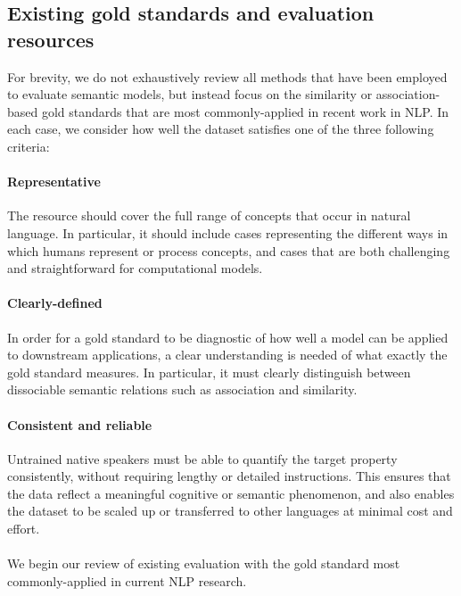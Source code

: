 \documentclass[fullname]{clv2}
\begin{document}
\subsection{Existing gold standards and evaluation resources}

For brevity, we do not exhaustively review all methods that have been employed to evaluate semantic models, but instead focus on the similarity or association-based gold standards that are most commonly-applied in recent work in NLP. In each case, we consider how well the dataset satisfies one of the three following criteria:  

\paragraph{Representative} The resource should cover the full range of concepts that occur in natural language. In particular, it should include cases representing the different ways in which humans represent or process concepts, and cases that are both challenging and straightforward for computational models. 

\paragraph{Clearly-defined} In order for a gold standard to be diagnostic of how well a model can be applied to downstream applications, a clear understanding is needed of what exactly the gold standard measures. In particular, it must clearly distinguish between dissociable semantic relations such as association and similarity.

\paragraph{Consistent and reliable} Untrained native speakers must be able to quantify the target property consistently, without requiring lengthy or detailed instructions. This ensures that the data reflect a meaningful cognitive or semantic phenomenon, and also enables the dataset to be scaled up or transferred to other languages at minimal cost and effort.

\paragraph{}We begin our review of existing evaluation with the gold standard most commonly-applied in current NLP research. 

\noindent 
\end{document}
